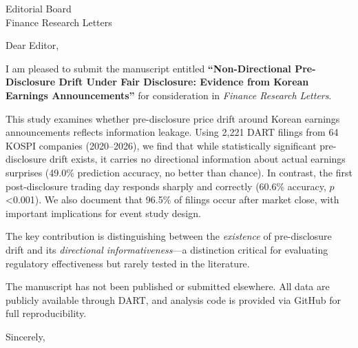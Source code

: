\documentclass[12pt]{letter}
\begin{document}
\begin{letter}{Editorial Board \\ Finance Research Letters}

\opening{Dear Editor,}

I am pleased to submit the manuscript entitled \textbf{``Non-Directional Pre-Disclosure Drift Under Fair Disclosure: Evidence from Korean Earnings Announcements''} for consideration in \textit{Finance Research Letters}.

This study examines whether pre-disclosure price drift around Korean earnings announcements reflects information leakage. Using 2,221 DART filings from 64 KOSPI companies (2020--2026), we find that while statistically significant pre-disclosure drift exists, it carries no directional information about actual earnings surprises (49.0\% prediction accuracy, no better than chance). In contrast, the first post-disclosure trading day responds sharply and correctly (60.6\% accuracy, $p$<0.001). We also document that 96.5\% of filings occur after market close, with important implications for event study design.

The key contribution is distinguishing between the \textit{existence} of pre-disclosure drift and its \textit{directional informativeness}---a distinction critical for evaluating regulatory effectiveness but rarely tested in the literature.

The manuscript has not been published or submitted elsewhere. All data are publicly available through DART, and analysis code is provided via GitHub for full reproducibility.

\closing{Sincerely,}

\signature{Yongjun Kim\\Department of Software\\Ajou University\\Suwon, South Korea\\yjkim0123@ajou.ac.kr}

\end{letter}
\end{document}
